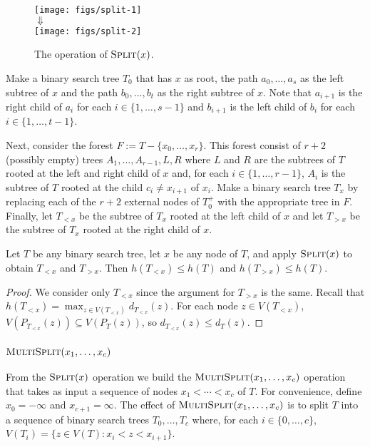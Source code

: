 \documentclass[kpfonts]{patmorin}
\let\le\leqslant
\begin{document}
\begin{figure}
  \begin{center}
    \texttt{[image: figs/split-1]} \\[1ex]
    $\Downarrow$ \\[1ex]
    \texttt{[image: figs/split-2]}
  \end{center}
  \caption{The operation of $\textsc{Split}(x)$.}
\end{figure}

Make a binary search tree $T_0$ that has $x$ as root, the path $a_0,\ldots,a_s$ as the left subtree of $x$ and the path $b_0,\ldots,b_t$ as the right subtree of $x$.  Note that $a_{i+1}$ is the right child of $a_i$ for each $i\in\{1,\ldots,s-1\}$ and $b_{i+1}$ is the left child of $b_i$ for each $i\in\{1,\ldots,t-1\}$. 

Next, consider the forest $F:=T-\{x_0,\ldots,x_r\}$. This forest consist of $r+2$ (possibly empty) trees $A_1,\ldots,A_{r-1},L,R$ where $L$ and $R$ are the subtrees of $T$ rooted at the left and right child of $x$ and, for each $i\in\{1,\ldots,r-1\}$, $A_i$ is the subtree of $T$ rooted at the child $c_i\neq x_{i+1}$ of $x_i$.  Make a binary search tree $T_x$ by replacing each of the $r+2$ external nodes of $T_0^+$ with the appropriate tree in $F$.  Finally, let $T_{<x}$ be the subtree of $T_x$ rooted at the left child of $x$ and let $T_{>x}$ be the subtree of $T_x$ rooted at the right child of $x$.

\begin{lem}
  Let $T$ be any binary search tree, let $x$ be any node of $T$, and apply $\textsc{Split}(x)$ to obtain $T_{<x}$ and $T_{>x}$.  
  Then $h(T_{<x})\le h(T)$ and $h(T_{>x})\le h(T)$.
\end{lem}

\begin{proof}
  We consider only $T_{<x}$ since the argument for $T_{>x}$ is the same.
  Recall that $h(T_{<x})=\max_{z\in V(T_{<x})} d_{T_{<x}}(z)$.  For each node $z\in V(T_{<x})$, $V(P_{T_{<x}}(z))\subseteq V(P_T(z))$, so $d_{T_{<x}}(z)\le d_T(z)$.
\end{proof}

\subsubsection{$\textsc{MultiSplit}(x_1,\ldots,x_c)$}

From the $\textsc{Split}(x)$ operation we build the $\textsc{MultiSplit}(x_1,\ldots,x_c)$ operation that takes as input a sequence of nodes $x_1<\cdots<x_c$ of $T$.  For convenience, define $x_0=-\infty$ and $x_{c+1}=\infty$.  The effect of $\textsc{MultiSplit}(x_1,\ldots,x_c)$ is to split $T$ into a sequence of binary search trees $T_0,\ldots,T_{c}$ where, for each $i\in\{0,\ldots,c\}$, $V(T_i)=\{z\in V(T): x_i< z<x_{i+1}\}$.
\end{document}
